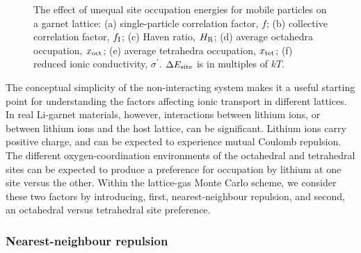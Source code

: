 \documentclass[aps,prb,twocolumn,superscriptaddress,reprint]{revtex4-1}
\begin{document}
\begin{figure}[tb]
  \centering
    \caption{\label{fig:site_energies_data}The effect of unequal site occupation energies for mobile particles on a garnet lattice: (a) single-particle correlation factor, $f$; (b) collective correlation factor, $f_{\mathrm{I}}$; (c) Haven ratio, $H_{\mathrm{R}}$; (d) average octahedra occupation, $x_{\mathrm{oct}}$; (e) average tetrahedra occupation, $x_{\mathrm{tet}}$; (f) reduced ionic conductivity, $\sigma^\prime$. $\Delta E_{\mathrm{site}}$ is in multiples of $kT$.}
\end{figure}

The conceptual simplicity of the non-interacting system makes it a useful starting point for understanding the factors affecting ionic transport in different lattices. 
In real Li-garnet materials, however, interactions between lithium ions, or between lithium ions and the host lattice, can be significant. 
Lithium ions carry positive charge, and can be expected to experience mutual Coulomb repulsion. The different oxygen-coordination environments of the octahedral and tetrahedral sites can be expected to produce a preference for occupation by lithium at one site versus the other.\cite{WangEtAl_NatMater2015} 
Within the lattice-gas Monte Carlo scheme, we consider these two factors by introducing, first, nearest-neighbour repulsion, and second, an octahedral versus tetrahedral site preference.

\subsubsection{Nearest-neighbour repulsion}
\end{document}
